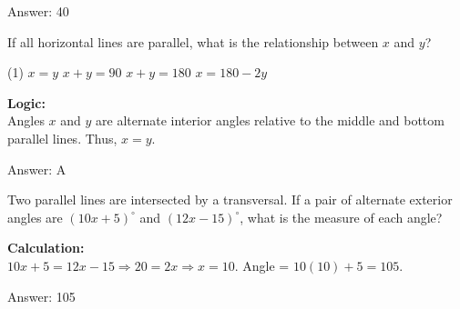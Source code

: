 \documentclass[11pt,paper=a4,answers]{exam}
\begin{document}
\begin{questions}
\begin{solution}
\vspace{30pt}

Answer: \colorbox{yellow!100}{40}
\end{solution}

\vspace{60pt}

\question
\begin{center}
\end{center}
If all horizontal lines are parallel, what is the relationship between $x$ and $y$?
\begin{tasks}(1)
    \task $x = y$
    \task $x + y = 90$
    \task $x + y = 180$
    \task $x = 180 - 2y$
\end{tasks}

\begin{solution}
\textbf{Logic:} \\
Angles $x$ and $y$ are alternate interior angles relative to the middle and bottom parallel lines. Thus, $x = y$.

\vspace{30pt}

Answer: \colorbox{yellow!100}{A}
\end{solution}

\vspace{60pt}

\question
Two parallel lines are intersected by a transversal. If a pair of alternate exterior angles are $(10x + 5)^\circ$ and $(12x - 15)^\circ$, what is the measure of each angle?

\begin{solution}
\textbf{Calculation:} \\
$10x + 5 = 12x - 15 \Rightarrow 20 = 2x \Rightarrow x = 10$.
Angle = $10(10) + 5 = 105$.

\vspace{30pt}

Answer: \colorbox{yellow!100}{105}
\end{solution}

\vspace{60pt}


\end{questions}
\end{document}
